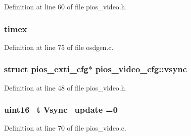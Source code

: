 Definition at line 60 of file pios\-\_\-video.\-h.

\hypertarget{group___p_i_o_s___v_i_d_e_o_gac6e460448d29f05aad59dc67c3035057}{
\subsubsection[{timex}]{ timex}}\label{group___p_i_o_s___v_i_d_e_o_gac6e460448d29f05aad59dc67c3035057}


Definition at line 75 of file osdgen.\-c.

\hypertarget{group___p_i_o_s___v_i_d_e_o_ga489c20025b1facf5435c66ff616e1cd9}{
\subsubsection[{vsync}]{\setlength{\rightskip}{0pt plus 5cm}struct {\bf pios\-\_\-exti\-\_\-cfg}$\ast$ pios\-\_\-video\-\_\-cfg\-::vsync}}\label{group___p_i_o_s___v_i_d_e_o_ga489c20025b1facf5435c66ff616e1cd9}


Definition at line 48 of file pios\-\_\-video.\-h.

\hypertarget{group___p_i_o_s___v_i_d_e_o_ga650b4db295bf40320fafbfce5954a39e}{
\subsubsection[{Vsync\-\_\-update}]{ {\bf uint16\-\_\-t} Vsync\-\_\-update =0}}\label{group___p_i_o_s___v_i_d_e_o_ga650b4db295bf40320fafbfce5954a39e}


Definition at line 70 of file pios\-\_\-video.\-c.

